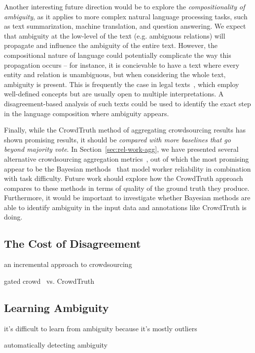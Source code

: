 Another interesting future direction would be to explore the \textit{compositionality of ambiguity}, as it applies to more complex natural language processing tasks, such as text summarization, machine translation, and question answering. We expect that ambiguity at the low-level of the text (e.g. ambiguous relations) will propagate and influence the ambiguity of the entire text. However, the compositional nature of language could potentially complicate the way this propagation occurs -- for instance, it is concievable to have a text where every entity and relation is unambiguous, but when considering the whole text, ambiguity is present. This is frequently the case in legal texts~\cite{edelman1992legal}, which employ well-defined concepts but are usually open to multiple interpretations. A disagreement-based analysis of such texts could be used to identify the exact step in the language composition where ambiguity appears.

Finally, while the CrowdTruth method of aggregating crowdsourcing results has shown promising results, it should be \textit{compared with more baselines that go beyond majority vote}. In Section~\ref{sec:rel-work-agg}, we have presented several alternative crowdsourcing aggregation metrics~\cite{welinder2010multidimensional,werling2015job,NIPS2009_3644,Bozzon:2013,Kittur2008,Ipeirotis:2010}, out of which the most promising appear to be the Bayesian methods~\cite{paun2018comparing} that model worker reliability in combination with task difficulty. Future work should explore how the CrowdTruth approach compares to these methods in terms of quality of the ground truth they produce. Furthermore, it would be important to investigate whether Bayesian methods are able to identify ambiguity in the input data and annotations like CrowdTruth is doing.


\subsection{The Cost of Disagreement}

an incremental approach to crowdsourcing

gated crowd~\cite{liu2016effective} vs. CrowdTruth


\subsection{Learning Ambiguity}

it's difficult to learn from ambiguity because it's mostly outliers

automatically detecting ambiguity~\cite{lebanoff2018automatic}

